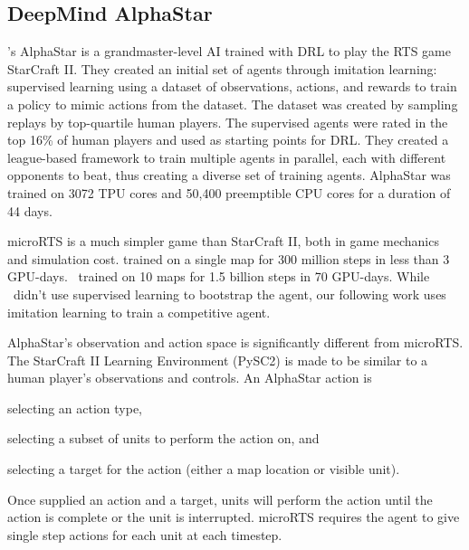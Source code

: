 \documentclass{article}
\begin{document}
\subsection{DeepMind AlphaStar}
\citet{Vinyals2019GrandmasterLI}'s AlphaStar is a grandmaster-level AI trained with DRL to play the RTS game
StarCraft II. They created an initial set of agents through imitation learning: supervised learning
using a dataset of observations, actions, and rewards to train a policy to mimic actions
from the dataset. The dataset was created by sampling replays by top-quartile human
players. The supervised agents were rated in the top 16\% of human players and used as
starting points for DRL. They created a league-based framework to train multiple agents
in parallel, each with different opponents to beat, thus creating a diverse set of
training agents. AlphaStar was trained on 3072 TPU cores and 50,400 preemptible CPU
cores for a duration of 44 days.

microRTS is a much simpler game than StarCraft II, both in game mechanics and simulation
cost. \citet{DBLP:journals/corr/abs-2105-13807} trained on a single map for 300 million
steps in less than 3 GPU-days. \agentName\ trained on 10 maps for 1.5 billion steps in
70 GPU-days. While \agentName\ didn't use supervised learning to bootstrap the agent,
our following work uses imitation learning to train a competitive agent.

AlphaStar's observation and action space is significantly different from microRTS. The
StarCraft II Learning Environment (PySC2) is made to be similar to a human player's
observations and controls. An AlphaStar action is 
\begin{inparaenum}[(1)]
    \item selecting an action type,
    \item selecting a subset of units to perform the action on, and
    \item selecting a target for the action (either a map location or visible unit).
\end{inparaenum}
Once supplied an action and a target, units will perform the action until the action is complete or the unit is interrupted.
microRTS requires the agent to give single step actions for each unit at each timestep.
\end{document}
